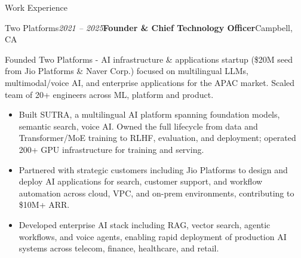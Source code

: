 \documentclass[
	10pt, %
]{resume} %
\begin{document}
\begin{rSection}{Work Experience}

	\begin{rSubsection}{Two Platforms}{\textit{2021 -- 2025}}{\textbf{Founder \& Chief Technology Officer}}{Campbell, CA}
\item[] Founded Two Platforms - AI infrastructure \& applications startup (\$20M seed from Jio Platforms \& Naver Corp.) focused on multilingual LLMs, multimodal/voice AI, and enterprise applications for the APAC market. Scaled team of 20+ engineers across ML, platform and product.
\begin{itemize}


\item Built SUTRA, a multilingual AI platform spanning foundation models, semantic search, voice AI. Owned the full lifecycle from data and Transformer/MoE training to RLHF, evaluation, and deployment; operated 200+ GPU infrastructure for training and serving.

\item Partnered with strategic customers including Jio Platforms to design and deploy AI applications for search, customer support, and workflow automation across cloud, VPC, and on-prem environments, contributing to \$10M+ ARR.

\item Developed enterprise AI stack including RAG, vector search, agentic workflows, and voice agents, enabling rapid deployment of production AI systems across telecom, finance, healthcare, and retail.


\end{itemize}
\end{rSubsection}
\end{rSection}
\end{document}
